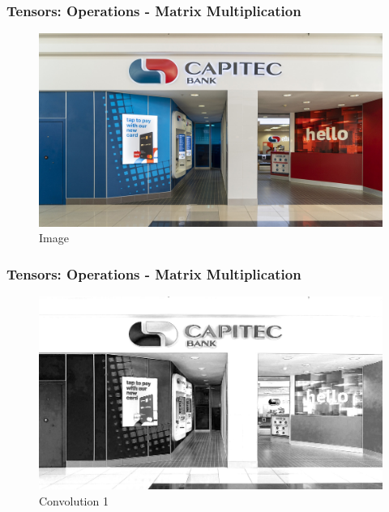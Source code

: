 \documentclass[11pt]{beamer}
\begin{document}
\begin{frame}
	\frametitle{Tensors: Operations - Matrix Multiplication}
	\begin{figure}
		\includegraphics[scale=0.17]{"1 - original_image"}
		\caption{Image}
	\end{figure}
\end{frame}

\begin{frame}
	\frametitle{Tensors: Operations - Matrix Multiplication}
	\begin{figure}
		\includegraphics[scale=0.17]{"conv_1"}
		\caption{Convolution 1}
	\end{figure}
\end{frame}
\end{document}
